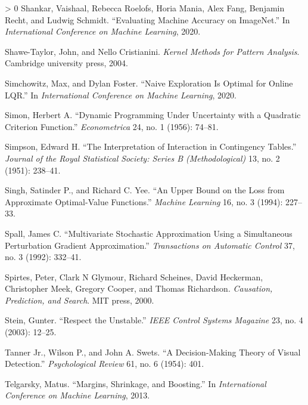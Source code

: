 \documentclass{tufte-book}
\newlength{\cslhangindent}
\newenvironment{CSLReferences}[3] %
 {%
  \setlength{\parindent}{0pt}
  \ifodd #1 \everypar{\setlength{\hangindent}{\cslhangindent}}\ignorespaces\fi
  \ifnum #2 > 0
  \setlength{\parskip}{#3\baselineskip}
  \fi
 }%
 {
 }
\begin{document}
\begin{CSLReferences}{1}{0}
\leavevmode\hypertarget{ref-shankar2020evaluating}{}%
Shankar, Vaishaal, Rebecca Roelofs, Horia Mania, Alex Fang, Benjamin
Recht, and Ludwig Schmidt. {``Evaluating Machine Accuracy on
ImageNet.''} In \emph{International Conference on Machine Learning},
2020.

\leavevmode\hypertarget{ref-shawe2004kernel}{}%
Shawe-Taylor, John, and Nello Cristianini. \emph{Kernel Methods for
Pattern Analysis}. Cambridge university press, 2004.

\leavevmode\hypertarget{ref-Simchowitz20}{}%
Simchowitz, Max, and Dylan Foster. {``Naive Exploration Is Optimal for
Online {LQR}.''} In \emph{International Conference on Machine Learning},
2020.

\leavevmode\hypertarget{ref-Simon56}{}%
Simon, Herbert A. {``Dynamic Programming Under Uncertainty with a
Quadratic Criterion Function.''} \emph{Econometrica} 24, no. 1 (1956):
74--81.

\leavevmode\hypertarget{ref-simpson1951interpretation}{}%
Simpson, Edward H. {``The Interpretation of Interaction in Contingency
Tables.''} \emph{Journal of the Royal Statistical Society: Series B
(Methodological)} 13, no. 2 (1951): 238--41.

\leavevmode\hypertarget{ref-Singh94}{}%
Singh, Satinder P., and Richard C. Yee. {``An Upper Bound on the Loss
from Approximate Optimal-Value Functions.''} \emph{Machine Learning} 16,
no. 3 (1994): 227--33.

\leavevmode\hypertarget{ref-spall1992multivariate}{}%
Spall, James C. {``Multivariate Stochastic Approximation Using a
Simultaneous Perturbation Gradient Approximation.''} \emph{Transactions
on Automatic Control} 37, no. 3 (1992): 332--41.

\leavevmode\hypertarget{ref-spirtes2000causation}{}%
Spirtes, Peter, Clark N Glymour, Richard Scheines, David Heckerman,
Christopher Meek, Gregory Cooper, and Thomas Richardson.
\emph{Causation, Prediction, and Search}. MIT press, 2000.

\leavevmode\hypertarget{ref-stein2003respect}{}%
Stein, Gunter. {``Respect the Unstable.''} \emph{IEEE Control Systems
Magazine} 23, no. 4 (2003): 12--25.

\leavevmode\hypertarget{ref-tanner1954}{}%
Tanner Jr., Wilson P., and John A. Swets. {``A Decision-Making Theory of
Visual Detection.''} \emph{Psychological Review} 61, no. 6 (1954): 401.

\leavevmode\hypertarget{ref-telgarsky2013margins}{}%
Telgarsky, Matus. {``Margins, Shrinkage, and Boosting.''} In
\emph{International Conference on Machine Learning}, 2013.


\end{CSLReferences}
\end{document}
